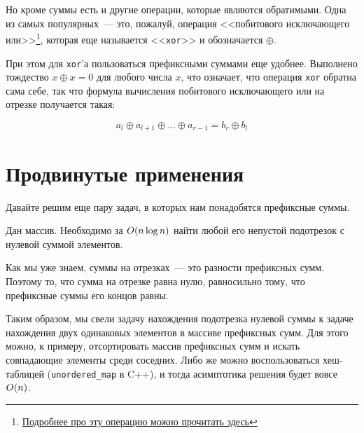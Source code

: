 
%
%

Но кроме суммы есть и другие операции, которые являются обратимыми. Одна из самых популярных~--- это, пожалуй, операция <<побитового исключающего или>>\footnote{ \href{https://learn.javascript.ru/bitwise-operators\#isklyuchayuschee-ili}{Подробнее про эту операцию можно прочитать здесь} }, которая еще называется <<\verb+xor+>> и обозначается $\oplus$.

При этом для \verb+xor+'а пользоваться префиксными суммами еще удобнее. Выполнено тождество $x \oplus x = 0$ для любого числа $x$, что означает, что операция \verb+xor+ обратна сама себе, так что формула вычисления побитового исключающего или на отрезке получается такая:

$$
a_l \oplus a_{l + 1} \oplus \ldots \oplus a_{r - 1} = b_r \oplus b_l
$$
\section{Продвинутые применения}

Давайте решим еще пару задач, в которых нам понадобятся префиксные суммы.

\begin{problem}
    Дан массив. Необходимо за $O(n \log n)$ найти любой его непустой подотрезок с нулевой суммой элементов.
\end{problem}

\begin{solution}
    Как мы уже знаем, суммы на отрезках~--- это разности префиксных сумм. Поэтому то, что сумма на отрезке равна нулю, равносильно тому, что префиксные суммы его концов равны.

    Таким образом, мы свели задачу нахождения подотрезка нулевой суммы к задаче нахождения двух одинаковых элементов в массиве префиксных сумм. Для этого можно, к примеру, отсортировать массив префиксных сумм и искать совпадающие элементы среди соседних.
    Либо же можно воспользоваться хеш-таблицей (\verb+unordered_map+ в C++), и тогда асимптотика решения будет вовсе $O(n)$.
\end{solution}

